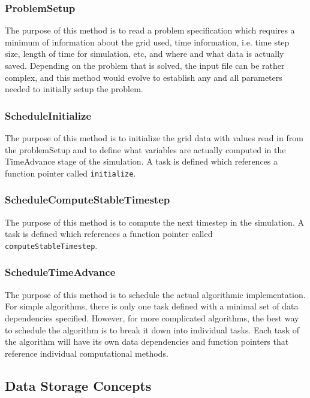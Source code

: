 \documentclass[12pt]{report}
\begin{document}
\subsubsection{ProblemSetup}

The purpose of this method is to read a problem specification which
requires a minimum of information about the grid used, time
information, i.e. time step size, length of time for simulation, etc,
and where and what data is actually saved.  Depending on the problem
that is solved, the input file can be rather complex, and this method
would evolve to establish any and all parameters needed to initially
setup the problem.

\subsubsection{ScheduleInitialize}

The purpose of this method is to initialize the grid data with values
read in from the problemSetup and to define what variables are
actually computed in the TimeAdvance stage of the simulation.  A task
is defined which references a function pointer called
\texttt{initialize}.

\subsubsection{ScheduleComputeStableTimestep}

The purpose of this method is to compute the next timestep in the
simulation.  A task is defined which references a function pointer
called \texttt{computeStableTimestep}.

\subsubsection{ScheduleTimeAdvance}

The purpose of this method is to schedule the actual algorithmic
implementation.  For simple algorithms, there is only one task defined
with a minimal set of data dependencies specified.  However, for more
complicated algorithms, the best way to schedule the algorithm is to
break it down into individual tasks.  Each task of the algorithm will
have its own data dependencies and function pointers that reference
individual computational methods.

\subsection{Data Storage Concepts}
\end{document}
